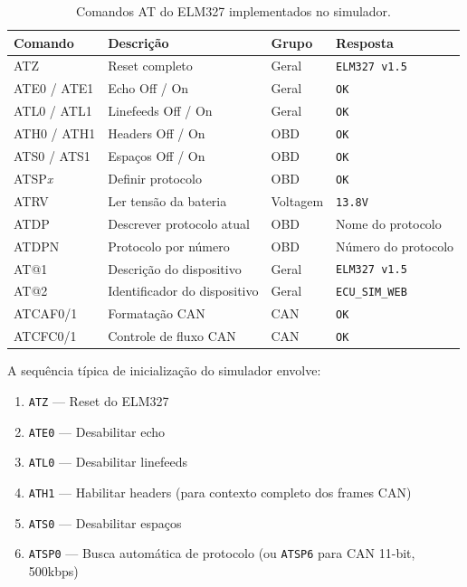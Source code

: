 \begin{table}[H]
\centering
\caption{Comandos AT do ELM327 implementados no simulador.}
\label{tab:comandos-at}
\begin{tabular}{@{}llll@{}}
\toprule
\textbf{Comando} & \textbf{Descrição} & \textbf{Grupo} & \textbf{Resposta} \\
\midrule
ATZ & Reset completo & Geral & \texttt{ELM327 v1.5} \\
ATE0 / ATE1 & Echo Off / On & Geral & \texttt{OK} \\
ATL0 / ATL1 & Linefeeds Off / On & Geral & \texttt{OK} \\
ATH0 / ATH1 & Headers Off / On & OBD & \texttt{OK} \\
ATS0 / ATS1 & Espaços Off / On & OBD & \texttt{OK} \\
ATSP\textit{x} & Definir protocolo & OBD & \texttt{OK} \\
ATRV & Ler tensão da bateria & Voltagem & \texttt{13.8V} \\
ATDP & Descrever protocolo atual & OBD & Nome do protocolo \\
ATDPN & Protocolo por número & OBD & Número do protocolo \\
AT@1 & Descrição do dispositivo & Geral & \texttt{ELM327 v1.5} \\
AT@2 & Identificador do dispositivo & Geral & \texttt{ECU\_SIM\_WEB} \\
ATCAF0/1 & Formatação CAN & CAN & \texttt{OK} \\
ATCFC0/1 & Controle de fluxo CAN & CAN & \texttt{OK} \\
\bottomrule
\end{tabular}
\end{table}

A sequência típica de inicialização do simulador envolve:
\begin{enumerate}
    \item \texttt{ATZ} --- Reset do ELM327
    \item \texttt{ATE0} --- Desabilitar echo
    \item \texttt{ATL0} --- Desabilitar linefeeds
    \item \texttt{ATH1} --- Habilitar headers (para contexto completo dos frames CAN)
    \item \texttt{ATS0} --- Desabilitar espaços
    \item \texttt{ATSP0} --- Busca automática de protocolo (ou \texttt{ATSP6} para CAN 11-bit, 500kbps)
\end{enumerate}

